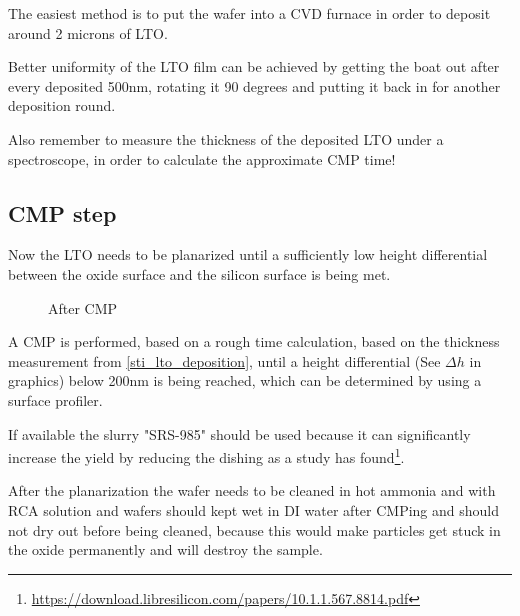 The easiest method is to put the wafer into a CVD furnace in order to deposit around 2 microns of LTO.

Better uniformity of the LTO film can be achieved by getting the boat out after every deposited 500nm, rotating it 90 degrees and putting it back in for another deposition round.

Also remember to measure the thickness of the deposited LTO under a spectroscope, in order to calculate the approximate CMP time!

\newpage

\subsection{CMP step}\label{sti_cmp_step}

Now the LTO needs to be planarized until a sufficiently low height differential between the oxide surface and the silicon surface is being met.

\begin{figure}[H]
	\centering
	\begin{tikzpicture}[node distance = 3cm, auto, thick,scale=\CrossSectionOnly, every node/.style={transform shape}]
		
	\end{tikzpicture}
	\begin{tikzpicture}[node distance = 3cm, auto, thick,scale=\CrossSectionOnly, every node/.style={transform shape}]
		
	\end{tikzpicture}
	\begin{tikzpicture}[node distance = 3cm, auto, thick,scale=\CrossSectionOnly, every node/.style={transform shape}]
		
	\end{tikzpicture}
	\caption{After CMP}
\end{figure}

A CMP is performed, based on a rough time calculation, based on the thickness measurement from \autoref{sti_lto_deposition}, until a height differential (See $\Delta h$ in graphics) below 200nm is being reached, which can be determined by using a surface profiler.

If available the slurry "SRS-985" should be used because it can significantly increase the yield by reducing the dishing as a study has found\footnote{\url{https://download.libresilicon.com/papers/10.1.1.567.8814.pdf}}.

After the planarization the wafer needs to be cleaned in hot ammonia and with RCA solution and wafers should kept wet in DI water after CMPing and should not dry out before being cleaned, because this would make particles get stuck in the oxide permanently and will destroy the sample.

